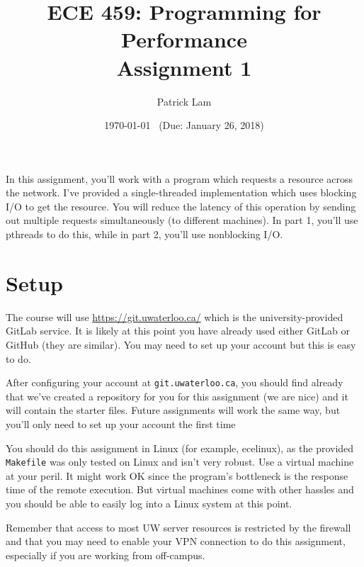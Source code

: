 \documentclass[letterpaper,10pt]{article}
\title{\bf ECE 459: Programming for Performance\\Assignment 1}
\author{Patrick Lam}
\date{\today ~ (Due: January 26, 2018)}
\begin{document}
\maketitle

In this assignment, you'll work with a program which requests a
resource across the network. I've provided 
a single-threaded implementation which uses blocking I/O to get the
resource. You will reduce the latency of this operation by sending out
multiple requests simultaneously (to different machines). In part 1,
you'll use pthreads to do this, while in part 2, you'll use
nonblocking I/O.

\section*{Setup}


The course will use \url{https://git.uwaterloo.ca/} which is the university-provided
GitLab service. It is likely at this point you have already used either GitLab or GitHub (they are similar). You may need to set up your account but this is easy to do.

After configuring your account at {\tt git.uwaterloo.ca}, you should find already that we've created a repository for you for this assignment (we are nice) and it will contain the starter files. Future assignments will work the same way, but you'll only need to set up your account the first time

You should do this assignment in Linux (for example, ecelinux), 
as the provided {\tt Makefile} was only tested on Linux and isn't very robust.
Use a virtual machine at your peril. It might work OK since the program's
bottleneck is the response time of the remote execution. But virtual machines come
with other hassles and you should be able to easily log into a Linux system at this
point.

Remember that access to most UW server resources is restricted by the firewall and that you may need to enable your VPN connection to do this assignment, especially if you are working from off-campus.

\end{document}
